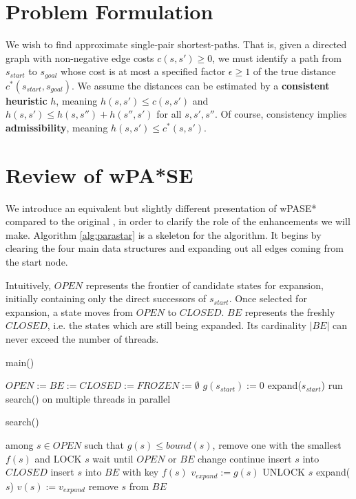 \documentclass[letterpaper]{article}
\begin{document}
\section{Problem Formulation}

We wish to find approximate single-pair shortest-paths. That is, given a directed graph with non-negative edge costs $c(s,s') \ge 0$, we must identify a path from $s_{start}$ to $s_{goal}$ whose cost is at most a specified factor $\epsilon\ge 1$ of the true distance $c^*(s_{start},s_{goal})$. We assume the distances can be estimated by a \textbf{consistent heuristic} $h$, meaning $h(s,s')\le c(s,s')$ and $h(s,s')\le h(s,s'') + h(s'',s')$ for all $s,s',s''$. Of course, consistency implies \textbf{admissibility}, meaning $h(s,s')\le c^*(s,s')$.

\section{Review of wPA*SE}

We introduce an equivalent but slightly different presentation of wPASE* compared to the original \cite{asdf}, in order to clarify the role of the enhancements we will make. Algorithm \ref{alg:parastar} is a skeleton for the algorithm. It begins by clearing the four main data structures and expanding out all edges coming from the start node.

Intuitively, $OPEN$ represents the frontier of candidate states for expansion, initially containing only the direct successors of $s_{start}$. Once selected for expansion, a state moves from $OPEN$ to $CLOSED$. $BE$ represents the freshly $CLOSED$, i.e. the states which are still being expanded. Its cardinality $|BE|$ can never exceed the number of threads.

\begin{algorithm}
\caption{main()}
\label{alg:parastar}
\begin{algorithmic}
\STATE $OPEN := BE := CLOSED := FROZEN := \emptyset$
\STATE $g(s_{start}) := 0$
\STATE expand($s_{start}$)
\STATE run search() on multiple threads in parallel
\end{algorithmic}
\end{algorithm}

\begin{algorithm}
\caption{search()}
\label{alg:search}
\begin{algorithmic}
\STATE among $s\in OPEN$ such that $g(s) \le bound(s)$, remove one with the smallest $f(s)$ and LOCK $s$
\STATE wait until $OPEN$ or $BE$ change
\STATE continue
\ENDIF
\STATE insert $s$ into $CLOSED$
\STATE insert $s$ into $BE$ with key $f(s)$
\STATE $v_{expand} := g(s)$
\STATE UNLOCK $s$
\STATE expand($s$)
\STATE $v(s) := v_{expand}$
\STATE remove $s$ from $BE$
\ENDWHILE
\end{algorithmic}
\end{algorithm}
\end{document}
